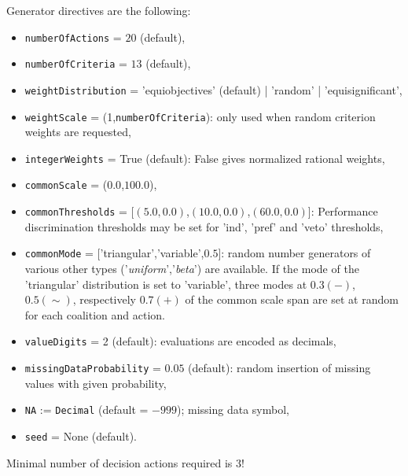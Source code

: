 Generator directives are the following:
\begin{itemize}
\item \texttt{numberOfActions} = $20$ (default),
\item \texttt{numberOfCriteria} = $13$ (default),
\item \texttt{weightDistribution} = 'equiobjectives' (default) | 'random' | 'equisignificant',
\item \texttt{weightScale} = (1,\texttt{numberOfCriteria}): only used when random criterion weights are requested,
\item \texttt{integerWeights} = True (default): False gives normalized rational weights, 
\item \texttt{commonScale} = ($0.0$,$100.0$),
\item \texttt{commonThresholds} = [$(5.0,0.0)$,$(10.0,0.0)$,$(60.0,0.0)$]: Performance discrimination thresholds may be set for 'ind', 'pref' and 'veto' thresholds,  
\item \texttt{commonMode} = ['triangular','variable',$0.5$]: random number generators of various other types ('\emph{uniform}','\emph{beta}') are available. If the mode of the 'triangular' distribution is set to 'variable', three modes at $0.3 (-)$, $0.5 (\sim)$, respectively $0.7 (+)$ of the common scale span are set at random for each coalition and action. 
\item \texttt{valueDigits} = 2 (default): evaluations are encoded as decimals,
\item \texttt{missingDataProbability} = $0.05$ (default): random insertion of missing values with given probability,  
\item \texttt{NA} := \texttt{Decimal} (default = $-999$); missing data symbol,
\item \texttt{seed} = None (default). 
\end{itemize}
Minimal number of decision actions required is 3! 

